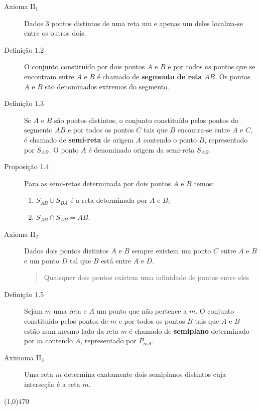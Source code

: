 \documentclass[11pt]{article}
\begin{document}
\begin{description}
  \item[Axioma II$_{1}$] Dados 3 pontos distintos de uma reta um e apenas
    um deles localiza-se entre os outros dois.
  \item[Definição 1.2] O conjunto constituído por dois pontos $A$ e $B$ e por
    todos os pontos que se encontram entre $A$ e $B$ é chamado de
    \textbf{segmento de reta} $AB$. Os pontos $A$ e $B$ são denominados
    extremos do segmento.
  \item[Definição 1.3] Se $A$ e $B$ são pontos distintos, o conjunto
    constituído pelos pontos do segmento $AB$ e por todos os pontos $C$ tais
    que
    $B$ encontra-se entre $A$ e $C$, é chamado de \textbf{semi-reta} de
    origem $A$ contendo o ponto $B$, representado por $S_{AB}$. O ponto $A$ é
    denominado origem da semi-reta $S_{AB}$.
  \item[Proposição 1.4] Para as semi-retas determinada por dois pontos $A$ e
    $B$ temos:

  \begin{enumerate} \itemsep1pt \parskip0pt 
    \item $S_{AB} \cup S_{BA}$ é a reta determinada por $A$ e $B$;
    \item $S_{AB} \cap S_{AB} = AB$.
  \end{enumerate}

  \item[Axioma II$_{2}$] Dados dois pontos distintos $A$ e $B$ sempre existem
    um ponto $C$ entre $A$ e $B$ e um ponto $D$ tal que $B$ está entre $A$ e
    $D$.

  \begin{quote}
    Quaisquer dois pontos existem uma infinidade de pontos entre eles
  \end{quote}

  \item[Definição 1.5] Sejam $m$ uma reta e $A$ um ponto que não pertence a
    $m$. O conjunto constituído pelos pontos de $m$ e por todos os pontos $B$
    tais que $A$ e $B$ estão num mesmo lado da reta $m$ é chamado de
    \textbf{semiplano} determinado por $m$ contendo $A$, representado por
    $P_{mA}$.

  \item[Aximoma II$_{3}$] Uma reta $m$ determina exatamente dois semiplanos
    distintos cuja interseção é a reta $m$.
\end{description}

\line(1,0){470}
\end{document}
